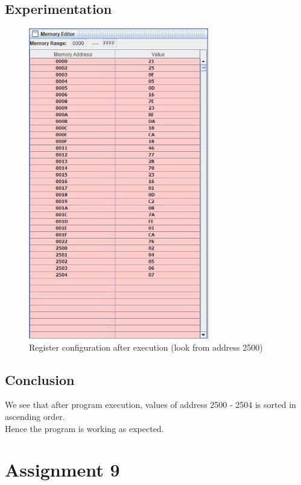 \documentclass[a4paper]{article} %
\begin{document}
    \subsection{Experimentation}
        \begin{figure}[h!]
            \centering
            \includegraphics[width=0.7\textwidth]{Assignment 3/2_sort/mem_output.png}
            \caption{Register configuration after execution (look from address 2500)}
            \label{fg7}
        \end{figure}
    \subsection{Conclusion}
        We see that after program execution, values of address 2500 - 2504 is sorted in ascending order.\\
        Hence the program is working as expected.
\newpage

\section[Subroutine to save Register Status]{Assignment 9} %
\end{document}
